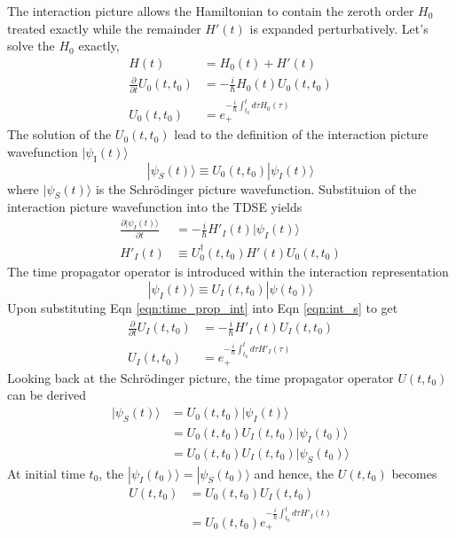 \documentclass{article}
\begin{document}
The interaction picture allows the Hamiltonian to contain the zeroth order $H_0$
treated exactly while the remainder $H'(t)$ is expanded perturbatively. Let's
solve the $H_0$ exactly,
\begin{align}
  H(t) & = H_0(t) + H'(t) \\
  \frac{\partial}{\partial t}U_0(t,t_0) & = -\frac{i}{\hbar}H_0(t)U_0(t,t_0) \\
  U_0(t,t_0) & = e_+^{-\frac{i}{\hbar}\int^t_{t_0}d\tau H_0(\tau)}
\end{align}
The solution of the $U_0(t,t_0)$ lead to the definition of the interaction
picture wavefunction $|\psi_{\text{I}}(t)\rangle$
\begin{equation}
  |\psi_S(t)\rangle\equiv U_0(t,t_0)|\psi_I(t)\rangle
  \label{eqn:int_wave}
\end{equation}
where $|\psi_S(t)\rangle$ is the Schr{\"o}dinger picture wavefunction.
Substituion of the interaction picture wavefunction into the TDSE yields
\begin{align}
  \frac{\partial |\psi_I(t)\rangle}{\partial t} & = -\frac{i}{\hbar}H'_I(t)|\psi_I(t)\rangle
  \label{eqn:int_s}\\
  H'_I(t) & \equiv U_0^{\dagger}(t,t_0)H'(t)U_0(t,t_0)
\end{align}
The time propagator operator is introduced within the interaction representation
\begin{equation}
  |\psi_I(t)\rangle \equiv U_I(t,t_0)|\psi(t_0)\rangle
  \label{eqn:time_prop_int}
\end{equation}
Upon substituting Eqn \eqref{eqn:time_prop_int} into Eqn \eqref{eqn:int_s} to
get
\begin{align}
  \frac{\partial}{\partial t} U_I(t,t_0) & = -\frac{i}{\hbar}H'_I(t)U_I(t,t_0) \\
  U_I(t,t_0) & = e_+^{-\frac{i}{\hbar}\int^t_{t_0}d\tau H'_I(\tau)}
  \label{eqn:int_time_soln}
\end{align}
Looking back at the Schr{\"o}dinger picture, the time propagator operator $U(t,t_0)$
can be derived
\begin{align}
  |\psi_S(t)\rangle & = U_0(t,t_0)|\psi_I(t)\rangle \\
  & = U_0(t,t_0)U_I(t,t_0)|\psi_I(t_0)\rangle \\
  & = U_0(t,t_0)U_I(t,t_0)|\psi_S(t_0)\rangle
\end{align}
At initial time $t_0$, the $|\psi_I(t_0)\rangle = |\psi_S(t_0)\rangle$ and hence,
the $U(t,t_0)$ becomes
\begin{align}
  U(t,t_0) & = U_0(t,t_0)U_I(t,t_0) \\
  & = U_0(t,t_0)e_+^{-\frac{i}{\hbar}\int_{t_0}^td\tau H'_I(t)}
\end{align}
\end{document}
